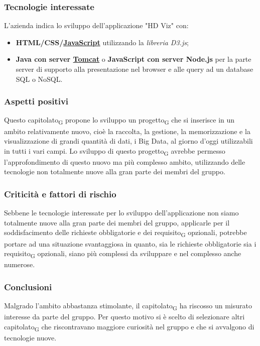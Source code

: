 \subsubsection{Tecnologie interessate}
L'azienda indica lo sviluppo dell'applicazione "HD Viz" con:
\begin{itemize}
\item \textbf{HTML/CSS/\href{https://developer.mozilla.org/en-US/docs/Web/JavaScript/About_JavaScript}{JavaScript}} utilizzando la \textit{libreria D3.js};
\item \textbf{Java con server \href{http://tomcat.apache.org/}{Tomcat}} o \textbf{JavaScript con server Node.js} per la parte server di supporto alla presentazione nel browser e alle query ad un database SQL o NoSQL.
\end{itemize}
\subsubsection{Aspetti positivi}
Questo capitolato\textsubscript{G} propone lo sviluppo un progetto\textsubscript{G} che si inserisce in un ambito relativamente nuovo, cioè la raccolta, la gestione, la memorizzazione e la visualizzazione di grandi quantità di dati, i Big Data, al giorno d'oggi utilizzabili in tutti i vari campi.
Lo sviluppo di questo progetto\textsubscript{G} avrebbe permesso l'approfondimento di questo nuovo ma più complesso ambito, utilizzando delle tecnologie non totalmente nuove alla gran parte dei membri del gruppo.
\subsubsection{Criticità e fattori di rischio}
Sebbene le tecnologie interessate per lo sviluppo dell'applicazione non siamo totalmente nuove alla gran parte dei membri del gruppo, applicarle per il soddisfacimento delle richieste obbligatorie e dei requisito\textsubscript{G} opzionali, potrebbe portare ad una situazione svantaggiosa in quanto, sia le richieste obbligatorie sia i requisito\textsubscript{G} opzionali, siano più complessi da sviluppare e nel complesso anche numerose.
\subsubsection{Conclusioni}
Malgrado l'ambito abbastanza stimolante, il capitolato\textsubscript{G} ha riscosso un misurato interesse da parte del gruppo.
Per questo motivo si è scelto di selezionare altri capitolato\textsubscript{G} che riscontravano maggiore curiosità nel gruppo e che si avvalgono di tecnologie nuove.